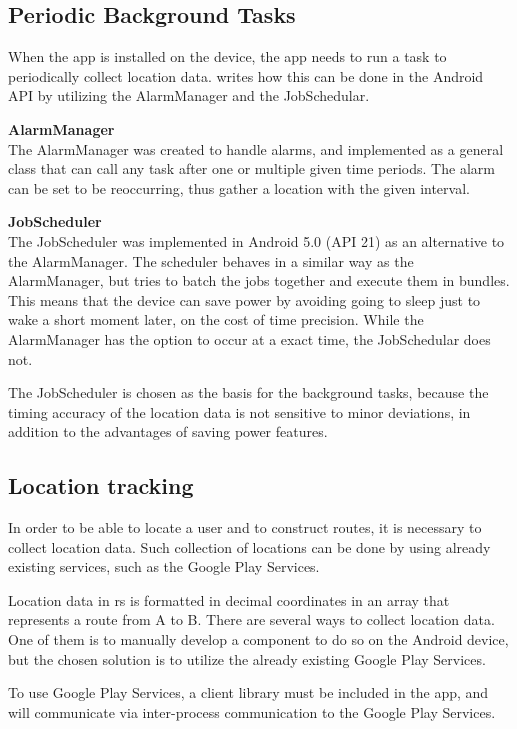 \subsection{Periodic Background Tasks}\label{ssec:periodictasks}
When the app is installed on the device, the app needs to run a task to periodically collect location data.
 writes how this can be done in the Android API by utilizing the AlarmManager and the JobSchedular.

\textbf{AlarmManager}\\
The AlarmManager was created to handle alarms, and implemented as a general class that can call any task after one or multiple given time periods.
The alarm can be set to be reoccurring, thus gather a location with the given interval.

\textbf{JobScheduler}\\
The JobScheduler was implemented in Android 5.0 (API 21) as an alternative to the AlarmManager.
The scheduler behaves in a similar way as the AlarmManager, but tries to batch the jobs together and execute them in bundles.
This means that the device can save power by avoiding going to sleep just to wake a short moment later, on the cost of time precision. 
While the AlarmManager has the option to occur at a exact time, the JobSchedular does not.

The JobScheduler is chosen as the basis for the background tasks, because the timing accuracy of the location data is not sensitive to minor deviations, in addition to the advantages of saving power features.

\subsection{Location tracking}\label{ssec:loctrack}
In order to be able to locate a user and to construct routes, it is necessary to collect location data. 
Such collection of locations can be done by using already existing services, such as the Google Play Services.

Location data in \gls{rs} is formatted in decimal coordinates in an array that represents a route from A to B.
There are several ways to collect location data. 
One of them is to manually develop a component to do so on the Android device, but the chosen solution is to utilize the already existing Google Play Services.

To use Google Play Services, a client library must be included in the app, and will communicate via inter-process communication to the Google Play Services. 

